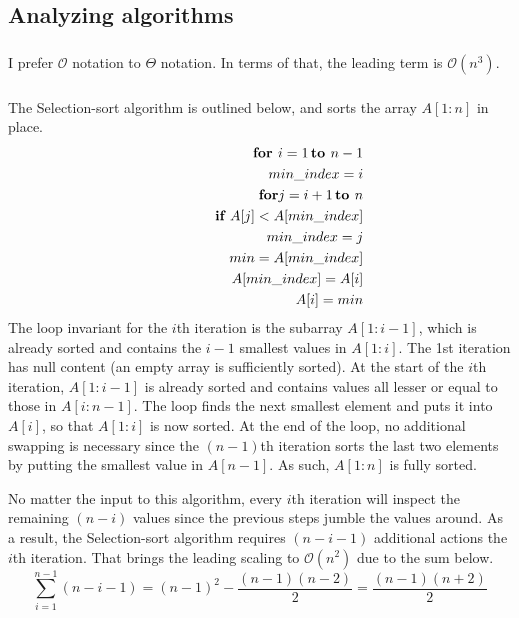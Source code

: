 \subsection{Analyzing algorithms}

\subsubsection{}
    I prefer $\mathcal O$ notation to $\Theta$ notation.  In terms of that, the leading term is $\mathcal O\left( n^3 \right)$.

\subsubsection{}
    The Selection-sort algorithm is outlined below, and sorts the array $A[1:n]$ in place.
    \begin{eqnarray}
        &\,& \text{\bf for } i = 1\, \text{\bf to } n-1
        \\ \nonumber &\,& \quad min\_index = i
        \\ \nonumber &\,& \qquad {\bf for } j = i + 1 \,\text{\bf to } n
        \\ \nonumber &\,& \qquad \quad \text{\bf if } A[j] < A[min\_index]
        \\ \nonumber &\,& \qquad \qquad min\_index = j
        \\ \nonumber &\,& \quad min = A[min\_index]
        \\ \nonumber &\,& \quad A[min\_index] = A[i]
        \\ \nonumber &\,& \quad A[i] = min
    \end{eqnarray}
    The loop invariant for the $i$th iteration is the subarray $A[1:i-1]$, which is already sorted and contains the $i-1$ smallest values in $A[1:i]$.  The 1st iteration has null content (an empty array is sufficiently sorted).  At the start of the $i$th iteration, $A[1:i-1]$ is already sorted and contains values all lesser or equal to those in $A[i:n-1]$.  The loop finds the next smallest element and puts it into $A[i]$, so that $A[1:i]$ is now sorted.  At the end of the loop, no additional swapping is necessary since the $(n-1)$th iteration sorts the last two elements by putting the smallest value in $A[n-1]$.  As such, $A[1:n]$ is fully sorted.

    No matter the input to this algorithm, every $i$th iteration will inspect the remaining $(n-i)$ values since the previous steps jumble the values around.  As a result, the Selection-sort algorithm requires $(n-i-1)$ additional actions the $i$th iteration.  That brings the leading scaling to $\mathcal O(n^2)$ due to the sum below.
    \begin{equation}
        \sum_{i=1}^{n-1} (n - i - 1) = (n-1)^2 - \frac{(n-1)(n-2)}{2} = \frac{(n-1)(n+2)}{2}
    \end{equation}

